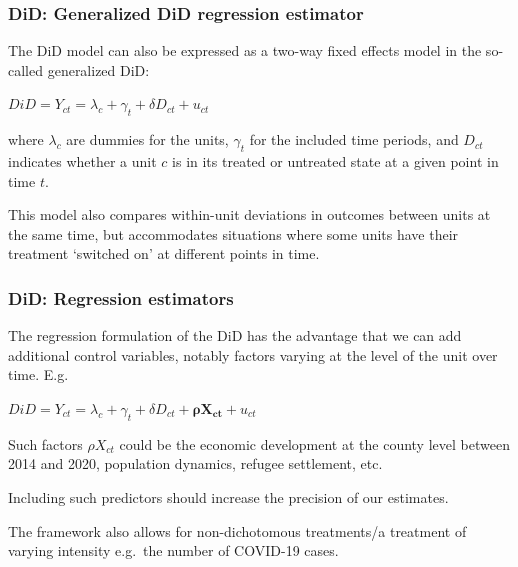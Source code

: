\documentclass[12pt,english,dvipsnames,aspectratio=169,handout]{beamer}\usepackage[]{graphicx}\usepackage[]{xcolor}
\begin{document}
\begin{frame}
  \frametitle{DiD: Generalized DiD regression estimator}
\footnotesize

The DiD model can also be expressed as a two-way fixed effects model in the so-called generalized DiD:

$DiD = Y_{ct} = \lambda_c + \gamma_t + \delta D_{ct} + u_{ct}$

where $\lambda_c$ are dummies for the units, $\gamma_t$ for the included time periods, and $D_{ct}$ indicates whether a unit $c$ is in its treated or untreated state at a given point in time $t$. 

This model also compares within-unit deviations in outcomes between units at the same time, but accommodates situations where some units have their treatment `switched on' at different points in time.

\end{frame}



\begin{frame}
  \frametitle{DiD: Regression estimators}
\footnotesize

The regression formulation of the DiD has the advantage that we can add additional control variables, notably factors varying at the level of the unit over time. E.g.\

$DiD = Y_{ct} = \lambda_c + \gamma_t + \delta D_{ct} + \bm{\rho X_{ct}} + u_{ct}$

Such factors $\rho X_{ct}$ could be the economic development at the county level between 2014 and 2020, population dynamics, refugee settlement, etc.

Including such predictors should increase the precision of our estimates.

The framework also allows for non-dichotomous treatments/a treatment of varying intensity e.g.\ the number of COVID-19 cases.

\end{frame}
\end{document}
